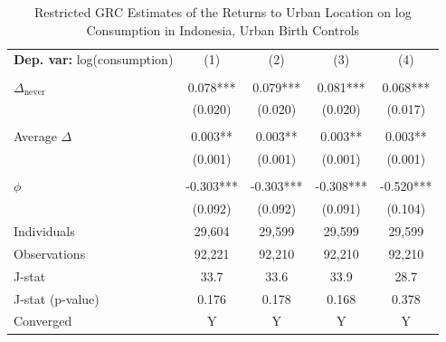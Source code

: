 \begin{table}[htbp] \centering \begin{threeparttable}
 \caption{Restricted GRC Estimates of the Returns to Urban Location on log Consumption in Indonesia, Urban Birth Controls} 
 \label{tab:GRC_IDN_consumption_urban_unb_birth} 
\begin{tabular}{l cccc} \toprule  \textbf{Dep. var:}  log(consumption) 
                    &\multicolumn{1}{c}{(1)}   &\multicolumn{1}{c}{(2)}   &\multicolumn{1}{c}{(3)}   &\multicolumn{1}{c}{(4)}   \\
                    &               &               &               &               \\
\addlinespace
$\Delta_{\text{never}}$&       0.078***&       0.079***&       0.081***&       0.068***\\
                    &     (0.020)   &     (0.020)   &     (0.020)   &     (0.017)   \\
                    &               &               &               &               \\
\addlinespace
Average $\Delta$    &       0.003** &       0.003** &       0.003** &       0.003** \\
                    &     (0.001)   &     (0.001)   &     (0.001)   &     (0.001)   \\
                    &               &               &               &               \\
\addlinespace
$\phi$              &      -0.303***&      -0.303***&      -0.308***&      -0.520***\\
                    &     (0.092)   &     (0.092)   &     (0.091)   &     (0.104)   \\
\addlinespace
Individuals         &      29,604   &      29,599   &      29,599   &      29,599   \\
Observations        &      92,221   &      92,210   &      92,210   &      92,210   \\
J-stat              &        33.7   &        33.6   &        33.9   &        28.7   \\
J-stat (p-value)    &       0.176   &       0.178   &       0.168   &       0.378   \\
Converged           &           Y   &           Y   &           Y   &           Y   \\

\end{tabular}
\end{threeparttable}
\end{table}
